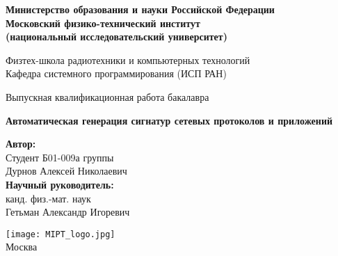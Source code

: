 \begin{center}

    \large\textbf{Министерство образования и науки Российской Федерации \\
    Московский физико-технический институт \\
    (национальный исследовательский университет)} \\
    \vspace{1cm}


    Физтех-школа радиотехники и компьютерных технологий \\

    Кафедра системного программирования (ИСП РАН) \\

    \vspace{3em}

    Выпускная квалификационная работа бакалавра
\end{center}

\begin{center}
    \vspace{\fill}
    \textbf{\LARGE{Автоматическая генерация сигнатур сетевых протоколов и приложений}}
    \vspace{\fill}
\end{center}


\begin{flushright}
    \textbf{Автор:} \\
    Студент Б01-009а группы \\
    Дурнов Алексей Николаевич \\
    \vspace{2em}
    \textbf{Научный руководитель:} \\
    канд. физ.-мат. наук \\
    Гетьман Александр Игоревич \\
\end{flushright}

\vspace{7em}

\begin{center}
    \texttt{[image: MIPT\_logo.jpg]}\\
    Москва \the\year{}
\end{center}

\thispagestyle{empty}
\newpage
\setcounter{page}{2}
\fancyfoot[c]{\thepage}
\fancyhead[L]{}
\fancyhead[R]{}
\fancyhead[C]{}
\renewcommand{\headrulewidth}{0pt}
